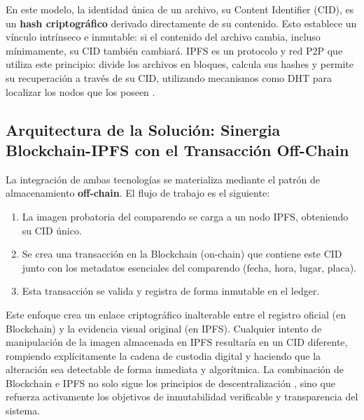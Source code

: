 En este modelo, la identidad única de un archivo, su Content Identifier (CID), es un \textbf{hash criptográfico} derivado directamente de su contenido. Esto establece un vínculo intrínseco e inmutable: si el contenido del archivo cambia, incluso mínimamente, su CID también cambiará. IPFS es un protocolo y red P2P que utiliza este principio: divide los archivos en bloques, calcula sus hashes y permite su recuperación a través de su CID, utilizando mecanismos como DHT para localizar los nodos que los poseen \parencite{maymounkov2002kademlia, benet2014ipfs}.

\subsection{Arquitectura de la Solución: Sinergia Blockchain-IPFS con el Transacción Off-Chain}
La integración de ambas tecnologías se materializa mediante el patrón de almacenamiento \textbf{off-chain}. El flujo de trabajo es el siguiente:
\begin{enumerate}
    \item La imagen probatoria del comparendo se carga a un nodo IPFS, obteniendo su CID único.
    \item Se crea una transacción en la Blockchain (on-chain) que contiene este CID junto con los metadatos esenciales del comparendo (fecha, hora, lugar, placa).
    \item Esta transacción se valida y registra de forma inmutable en el ledger.
\end{enumerate}
Este enfoque crea un enlace criptográfico inalterable entre el registro oficial (en Blockchain) y la evidencia visual original (en IPFS). Cualquier intento de manipulación de la imagen almacenada en IPFS resultaría en un CID diferente, rompiendo explícitamente la cadena de custodia digital y haciendo que la alteración sea detectable de forma inmediata y algorítmica. La combinación de Blockchain e IPFS no solo sigue los principios de descentralización \parencite{vanSteen2017}, sino que refuerza activamente los objetivos de inmutabilidad verificable y transparencia del sistema.

